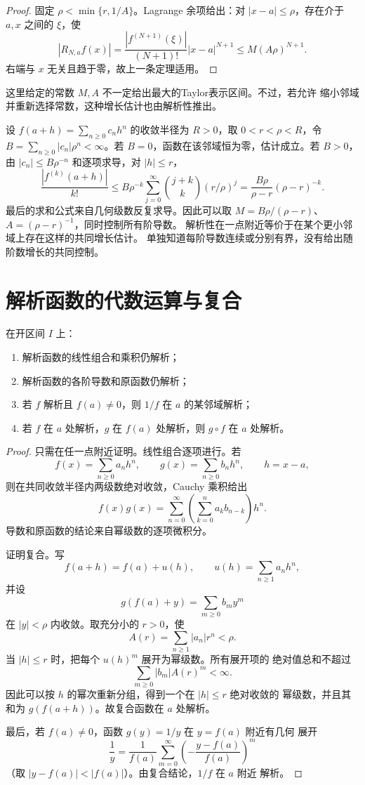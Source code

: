 \begin{proof}
固定 \(\rho<\min\{r,1/A\}\)。Lagrange 余项给出：对
\(|x-a|\le\rho\)，存在介于 \(a,x\) 之间的 \(\xi\)，使
\[
 |R_{N,a}f(x)|
 =\frac{|f^{(N+1)}(\xi)|}{(N+1)!}|x-a|^{N+1}
 \le M(A\rho)^{N+1}.
\]
右端与 \(x\) 无关且趋于零，故上一条定理适用。
\end{proof}

这里给定的常数 \(M,A\) 不一定给出最大的Taylor表示区间。不过，若允许
缩小邻域并重新选择常数，这种增长估计也由解析性推出。

设 \(f(a+h)=\sum_{n\ge0}c_nh^n\) 的收敛半径为 \(R>0\)，取
\(0<r<\rho<R\)，令 \(B=\sum_{n\ge0}|c_n|\rho^n<\infty\)。若
\(B=0\)，函数在该邻域恒为零，估计成立。若 \(B>0\)，由
\(|c_n|\le B\rho^{-n}\) 和逐项求导，对 \(|h|\le r\)，
\[
 \frac{|f^{(k)}(a+h)|}{k!}
 \le B\rho^{-k}\sum_{j=0}^\infty\binom{j+k}{k}(r/\rho)^j
 =\frac{B\rho}{\rho-r}(\rho-r)^{-k}.
\]
最后的求和公式来自几何级数反复求导。因此可以取
\(M=B\rho/(\rho-r)\)、\(A=(\rho-r)^{-1}\)，同时控制所有阶导数。
解析性在一点附近等价于在某个更小邻域上存在这样的共同增长估计。
单独知道每阶导数连续或分别有界，没有给出随阶数增长的共同控制。

\section{解析函数的代数运算与复合}

\begin{theorem}[解析运算]
\label{thm:analytic-operations}
在开区间 \(I\) 上：
\begin{enumerate}[label=\textup{(\roman*)}]
 \item 解析函数的线性组合和乘积仍解析；
 \item 解析函数的各阶导数和原函数仍解析；
 \item 若 \(f\) 解析且 \(f(a)\ne0\)，则 \(1/f\) 在 \(a\) 的某邻域解析；
 \item 若 \(f\) 在 \(a\) 处解析，\(g\) 在 \(f(a)\) 处解析，则
 \(g\circ f\) 在 \(a\) 处解析。
\end{enumerate}
\end{theorem}

\begin{proof}
只需在任一点附近证明。线性组合逐项进行。若
\[
 f(x)=\sum_{n\ge0}a_nh^n,\qquad
 g(x)=\sum_{n\ge0}b_nh^n,\qquad h=x-a,
\]
则在共同收敛半径内两级数绝对收敛，Cauchy 乘积给出
\[
 f(x)g(x)=\sum_{n=0}^\infty
 \left(\sum_{k=0}^na_kb_{n-k}\right)h^n.
\]
导数和原函数的结论来自幂级数的逐项微积分。

证明复合。写
\[
 f(a+h)=f(a)+u(h),\qquad u(h)=\sum_{n\ge1}a_nh^n,
\]
并设
\[
 g(f(a)+y)=\sum_{m\ge0}b_my^m
\]
在 \(|y|<\rho\) 内收敛。取充分小的 \(r>0\)，使
\[
 A(r)=\sum_{n\ge1}|a_n|r^n<\rho.
\]
当 \(|h|\le r\) 时，把每个 \(u(h)^m\) 展开为幂级数。所有展开项的
绝对值总和不超过
\[
 \sum_{m\ge0}|b_m|A(r)^m<\infty.
\]
因此可以按 \(h\) 的幂次重新分组，得到一个在 \(|h|\le r\) 绝对收敛的
幂级数，并且其和为 \(g(f(a+h))\)。故复合函数在 \(a\) 处解析。

最后，若 \(f(a)\ne0\)，函数 \(g(y)=1/y\) 在 \(y=f(a)\) 附近有几何
展开
\[
 \frac1y=\frac1{f(a)}
 \sum_{m=0}^\infty
 \left(-\frac{y-f(a)}{f(a)}\right)^m
\]
（取 \(|y-f(a)|<|f(a)|\)）。由复合结论，\(1/f\) 在 \(a\) 附近
解析。
\end{proof}

